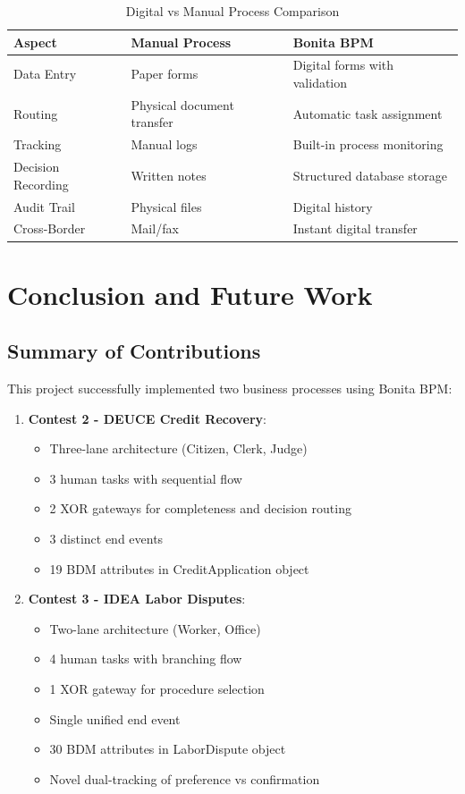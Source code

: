 \documentclass[12pt,a4paper]{article}
\begin{document}
\begin{table}[H]
\centering
\caption{Digital vs Manual Process Comparison}
\begin{tabular}{lll}
\toprule
\textbf{Aspect} & \textbf{Manual Process} & \textbf{Bonita BPM} \\
\midrule
Data Entry & Paper forms & Digital forms with validation \\
Routing & Physical document transfer & Automatic task assignment \\
Tracking & Manual logs & Built-in process monitoring \\
Decision Recording & Written notes & Structured database storage \\
Audit Trail & Physical files & Digital history \\
Cross-Border & Mail/fax & Instant digital transfer \\
\bottomrule
\end{tabular}
\label{tab:comparison}
\end{table}

\section{Conclusion and Future Work}

\subsection{Summary of Contributions}

This project successfully implemented two business processes using Bonita BPM:

\begin{enumerate}
    \item \textbf{Contest 2 - DEUCE Credit Recovery}:
    \begin{itemize}
        \item Three-lane architecture (Citizen, Clerk, Judge)
        \item 3 human tasks with sequential flow
        \item 2 XOR gateways for completeness and decision routing
        \item 3 distinct end events
        \item 19 BDM attributes in CreditApplication object
    \end{itemize}

    \item \textbf{Contest 3 - IDEA Labor Disputes}:
    \begin{itemize}
        \item Two-lane architecture (Worker, Office)
        \item 4 human tasks with branching flow
        \item 1 XOR gateway for procedure selection
        \item Single unified end event
        \item 30 BDM attributes in LaborDispute object
        \item Novel dual-tracking of preference vs confirmation
    \end{itemize}
\end{enumerate}
\end{document}
